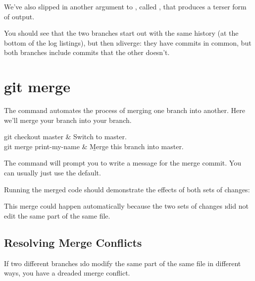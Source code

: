 \documentclass[letterpaper, 12pt, titlepage, twoside]{article}
\begin{document}
We've also slipped in another argument to , called ,
that produces a terser form of output.

You should see that the two branches start out with the same history (at the
bottom of the log listings), but then \i{diverge}: they have commits in
common, but both branches include commits that the other doesn't.


\section{git merge}


The \x {} command automates the process of merging one branch into
another. Here we'll merge your  branch into your 
branch.

\begin{typeme}
git checkout master & Switch to master. \\
git merge print-my-name & \b{Merge this branch into master.} \\
\end{typeme}

The  command will prompt you to write a message for the merge
commit. You can usually just use the default.

Running the merged code should demonstrate the effects of both sets of
changes:


This merge could happen automatically because the two sets of changes \i{did
  not edit the same part of the same file}.

\subsection*{Resolving Merge Conflicts}

If two different branches \i{do} modify the same part of the same file in
different ways, you have a dreaded \i{merge conflict}.

\end{document}

